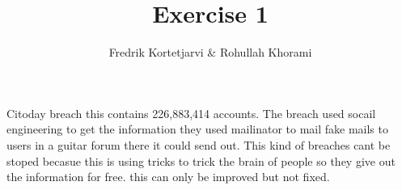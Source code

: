 \documentclass{article}
\author{Fredrik Kortetjarvi \& Rohullah Khorami}
\title{Exercise 1}
\begin{document}
    \maketitle
    \section{}
        Citoday breach this contains 226,883,414 accounts. The breach used socail engineering to get the information they used mailinator to 
        mail fake mails to users in a guitar forum there it could send out. This kind of breaches cant be stoped becasue this is using tricks 
        to trick the brain of people so they give out the information for free. this can only be improved but not fixed.\cite{cit0day} 
    \section{}
        
        \newpage
        \printbibliography
\end{document}
